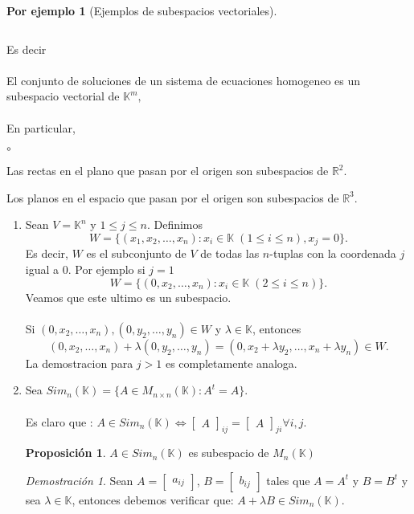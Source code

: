 \documentclass{article}
\theoremstyle{definition}
\theoremstyle{definition}
\newtheorem{prop}[teo]{Proposición}
\newtheorem*{ej}{Por ejemplo}
\theoremstyle{remark}
\newtheorem*{demo}{Demostración}
\begin{document}
\begin{ej}[Ejemplos de subespacios vectoriales]
\begin{enumerate}[label=\arabic*.]
\[    \]
   \end{enumerate}
 Es decir \\\\
  El conjunto de soluciones de un sistema de ecuaciones homogeneo es un subespacio vectorial de $\mathbb{K}^{m},$
\\\\
En particular, 
\begin{list}{$\circ$}{}  
\item Las rectas en el plano que pasan por el origen son subespacios de $\mathbb{R}^2$. 
\item Los planos en el espacio que pasan por el origen son subespacios de $\mathbb{R}^3$.
\end{list}
\begin{enumerate}[label=\arabic*. , start=4]
  \item Sean $V=\mathbb{K}^{n}$ y $1 \leq j \leq n$. Definimos \[
      W=\{(x_1, x_2, \dots ,x_n) : x_i \in \mathbb{K} \; ( 1 \leq i \leq n), x_j=0\}.
    \]
    Es decir, $W$ es el subconjunto de $V$ de todas las $n$-tuplas con la coordenada $j$ igual a $0$. Por ejemplo si $j=1$ \[
      W=\{(0,x_2,\dots ,x_n) : x_i \in \mathbb{K}  \; (2 \leq i \leq n)\}.
    \]
    Veamos que este ultimo es un subespacio. \\\\
    Si $(0,x_2,\dots ,x_n),(0,y_2,\dots, y_n) \in W$ y $\lambda \in \mathbb{K}$, entonces \[
      (0,x_2,\dots,x_n)+\lambda(0,y_2,\dots,y_n)=(0,x_2+\lambda y_2,\dots,x_n+\lambda y_n) \in W.
    \]
    La demostracion para $j>1$ es completamente analoga.
  \item Sea $Sim_n(\mathbb{K})=\{A \in M_{n \times n}(\mathbb{K}) : A^t=A\}$. \\\\ Es claro que : $A \in Sim_n(\mathbb{K}) \Leftrightarrow \begin{bmatrix}A\end{bmatrix}_{ij}=\begin{bmatrix}A\end{bmatrix}_{ji} \forall i,j$.
    \begin{prop}
      $A \in Sim_{n}(\mathbb{K})$ es subespacio de $M_n(\mathbb{K})$
    \end{prop}
    \begin{demo}
      Sean $A = \begin{bmatrix}a_{ij}\end{bmatrix}$, $B=\begin{bmatrix}b_{ij}\end{bmatrix}$ tales que $A=A^t$ y $B=B^t$ y sea $\lambda \in \mathbb{K}$, entonces debemos verificar que: $A+\lambda B \in Sim_{n}(\mathbb{K})$. 

\end{demo}
\end{enumerate}
\end{ej}
\end{document}
